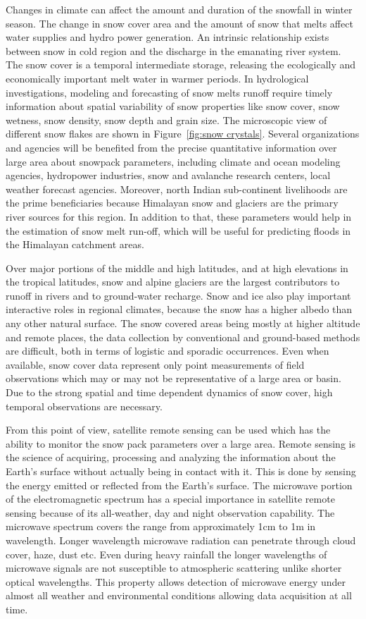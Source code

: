 Changes in climate can affect the amount and duration of the snowfall in winter season. The change in snow cover area and the amount of snow that melts affect water supplies and hydro power generation. An intrinsic relationship exists between snow in cold region and the discharge in the emanating river system. The snow cover is a temporal intermediate storage, releasing the ecologically and economically important melt water in warmer periods. In hydrological investigations, modeling and forecasting of snow melts runoff require timely information about spatial variability of snow properties like snow cover, snow wetness, snow density, snow depth and grain size. The microscopic view of different snow flakes are shown in Figure~\ref{fig:snow crystals}. Several organizations and agencies will be benefited from the precise quantitative information over large area about snowpack parameters, including climate and ocean modeling agencies, hydropower industries, snow and avalanche research centers, local weather forecast agencies. Moreover, north Indian sub-continent livelihoods are the prime beneficiaries because Himalayan snow and glaciers are the primary river sources for this region. In addition to that, these parameters would help in the estimation of snow melt run-off, which will be useful for predicting floods in the Himalayan catchment areas. 

Over major portions of the middle and high latitudes, and at high elevations in the tropical  latitudes, snow and alpine glaciers are the largest contributors to runoff in rivers and to ground-water recharge. Snow and ice also play important interactive roles in regional climates, because the snow has a higher albedo than any other natural surface. The snow covered areas being mostly at higher altitude and remote places, the data collection by conventional and ground-based methods are difficult, both in terms of logistic and sporadic occurrences. Even when available, snow cover data represent only point measurements of field observations which may or may not be representative of a large area or basin. Due to the strong spatial and time dependent dynamics of snow cover, high temporal observations are necessary. 

From this point of view, satellite remote sensing can be used which has the ability to monitor the snow pack parameters over a large area. Remote sensing is the science of acquiring, processing and analyzing the information about the Earth's surface without actually being in contact with it. This is done by sensing the energy emitted or reflected from the Earth's surface.  The microwave portion of the electromagnetic spectrum has a special importance in satellite remote sensing because of its all-weather, day and night observation capability. The microwave spectrum covers the range from approximately 1cm to 1m in wavelength. Longer wavelength microwave radiation can penetrate through cloud cover, haze, dust etc. Even during heavy rainfall the longer wavelengths of microwave signals are not susceptible to atmospheric scattering unlike shorter optical wavelengths. This property allows detection of microwave energy under almost all weather and environmental conditions allowing data acquisition at all time.

